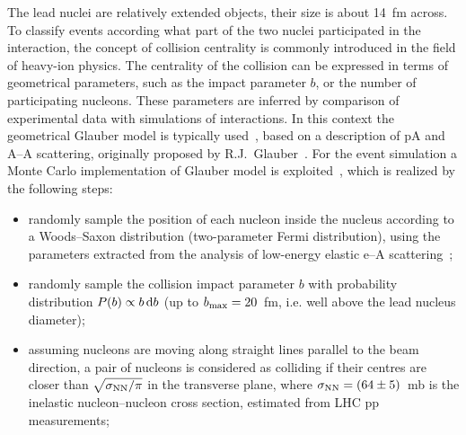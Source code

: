 The lead nuclei are relatively extended objects, their size is about 14~fm across. To classify events according what part of the two nuclei participated in the interaction, the concept of collision centrality is commonly introduced in the field of heavy-ion physics. The centrality of the collision can be expressed in terms of geometrical parameters, such as the impact parameter $b$, or the number of participating nucleons. These parameters are inferred by comparison of experimental data with simulations of interactions. In this context the geometrical Glauber model is typically used~\cite{Miller:2007ri}, based on a description of pA and A--A scattering, originally proposed by R.J.~Glauber~\cite{Glauber:1955qq,Glauber:2006gd}. For the event simulation a Monte Carlo implementation of Glauber model is exploited~\cite{Shor:1988vk,Alver:2008aq}, which is realized by the following steps:
\begin{itemize}
    \item{randomly sample the position of each nucleon inside the nucleus according to a Woods--Saxon distribution (two-parameter Fermi distribution), using the parameters extracted from the analysis of low-energy elastic e--A scattering~\cite{DeJager:1987qc};}
    \item{randomly sample the collision impact parameter $b$ with probability distribution $P(b) \propto b \, {\rm d}b$ (up to $b_{\rm max} = 20$~fm, i.e. well above the lead nucleus diameter);}
    \item{assuming nucleons are moving along straight lines parallel to the beam direction, a pair of nucleons is considered as colliding if their centres are closer than $\sqrt{\sigma_{\rm NN}/\pi}$ in the transverse plane, where $\sigma_{\rm NN} = (64 \pm 5)$~mb is the inelastic nucleon--nucleon cross section, estimated from LHC pp measurements;}
\end{itemize}
